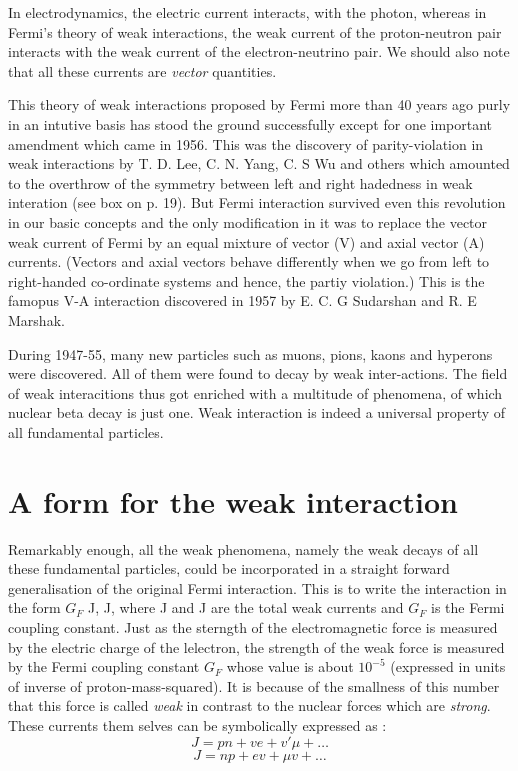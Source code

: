 In electrodynamics, the electric current interacts, with the photon, whereas in Fermi's theory of weak interactions, the weak current of the proton-neutron pair interacts with the weak current of the electron-neutrino pair. We should also note that all these currents are {\it vector} quantities.

This theory of weak interactions proposed by Fermi more than 40 years ago purly in an intutive basis has stood the ground successfully except for one important amendment which came in 1956. This was the discovery of parity-violation in weak interactions by T. D. Lee, C. N. Yang, C. S Wu and others which amounted to the overthrow of the symmetry between left and right hadedness in weak interation (see box on p. 19). But Fermi interaction survived even this revolution in our basic concepts and the only modification in it was to replace the vector weak current of Fermi by an equal mixture of vector (V) and axial vector (A) currents. (Vectors and axial vectors behave differently when we go from left to right-handed co-ordinate systems and hence, the partiy violation.) This is the famopus V-A interaction discovered in 1957 by E. C. G Sudarshan and R. E Marshak.

During 1947-55, many new particles such as muons, pions, kaons and hyperons were discovered. All of them were found to decay by weak inter-actions. The field of weak interacitions thus got enriched with a multitude of phenomena, of which nuclear beta decay is just one. Weak interaction is indeed a universal property of all fundamental particles.

\section*{A form for the weak interaction}

Remarkably enough, all the weak phenomena, namely the weak decays of all these fundamental particles, could be incorporated in a straight forward generalisation of the original Fermi interaction. This is to write the interaction in the form $G_{F}$ J, J, where J and J are the total weak currents and $G_{F}$ is the Fermi coupling constant. Just as the sterngth of the electromagnetic force is measured by the electric charge of the lelectron, the strength of the weak force is measured by the Fermi coupling constant $G_{F}$ whose value is about $10^{-5}$ (expressed in units of inverse of proton-mass-squared). It is because of the smallness of this number that this force is called {\it weak} in contrast to the nuclear forces which are {\it strong}. These currents them selves can be symbolically expressed as :
$$
J = pn + ve + v' \mu + \ldots 
$$
$$
J = np + ev + \mu v + \ldots 
$$ 

